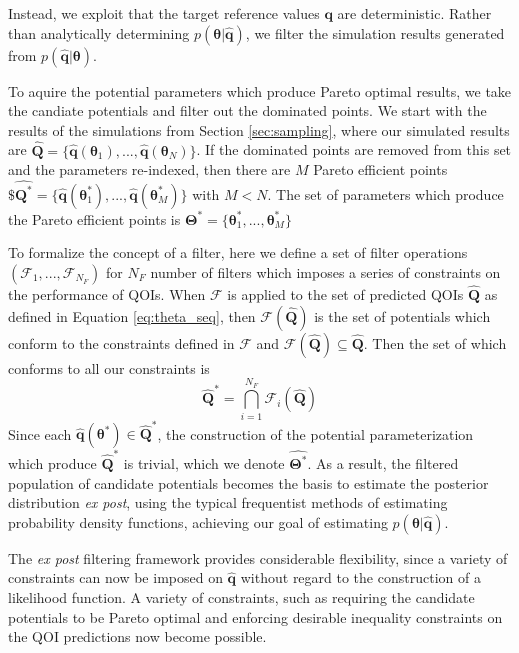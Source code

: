 Instead, we exploit that the target reference values $\bm{q}$ are deterministic.  Rather than analytically determining $p(\bm{\theta}|\hat{\bm{q}})$, we filter the simulation results generated from $p(\hat{\bm{q}}|\bm{\theta})$.

To aquire the potential parameters which produce Pareto optimal results, we take the candiate potentials and filter out the dominated points.  We start with the results of the simulations from Section \ref{sec:sampling}, where our simulated results are $\hat{\bm{Q}}= \{\hat{\bm{q}}(\bm{\theta}_1),...,\hat{\bm{q}}(\bm{\theta}_N)\}$.
 If the dominated points are removed from this set and the parameters re-indexed, then there are $M$ Pareto efficient points
 $\$\hat{\bm{Q}^*}
  = \{\hat{\bm{q}}(\bm{\theta}_1^*)
	  ,...
		,\hat{\bm{q}}(\bm{\theta}_M^*)\}$
  with $M < N$.  The set of parameters which produce the Pareto efficient points is
	$\bm{\Theta}^*=\{\bm{\theta}_1^*,...,\bm{\theta}_M^*\}$

To formalize the concept of a filter, here we define a set of filter operations $(\mathcal{F}_1,...,\mathcal{F}_{N_F})$ for $N_F$ number of filters which imposes a series of constraints on the performance of QOIs.  When $\mathcal{F}$ is applied to the set of  predicted QOIs $\hat{\bm{Q}}$ as defined in Equation \ref{eq:theta_seq}, then $\mathcal{F}(\hat{\bm{Q}})$ is the set of potentials which conform to the constraints defined in $\mathcal{F}$ and $\mathcal{F}(\hat{\bm{Q}}) \subseteq \hat{\bm{Q}}$.
Then the set of which conforms to all our constraints is
\begin{equation}
  \hat{\bm{Q}}^*
	=
	\bigcap_{i=1}^{N_F} \mathcal{F}_i(\hat{\bm{Q}})
\end{equation}
Since each  $\hat{\bm{q}}(\bm{\theta}^*) \in \hat{\bm{Q}}^*$, the construction of the potential parameterization which produce $\hat{\bm{Q}}^*$ is trivial, which we denote  $\hat{\bm{\Theta}^*}$.
As a result, the filtered population of candidate potentials becomes the basis to estimate the posterior distribution \emph{ex post}, using the typical frequentist methods of estimating probability density functions, achieving our goal of estimating $p(\bm{\theta}|\hat{\bm{q}})$.

The \emph{ex post} filtering framework provides considerable flexibility, since a variety of constraints can now be imposed on $\hat{\bm{q}}$ without regard to the construction of a likelihood function.
A variety of constraints, such as requiring the candidate potentials to be Pareto optimal and enforcing desirable inequality constraints on the QOI predictions now become possible.

